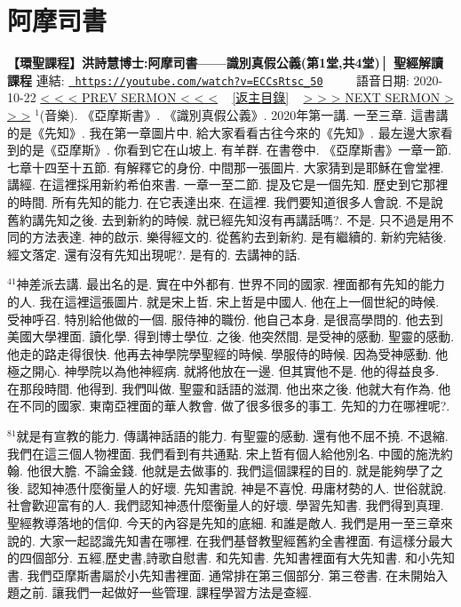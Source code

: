\documentclass{book}
\begin{document}
\section{阿摩司書}
\label{sec:ECCsRtsc_50}
\textbf{【環聖課程】洪詩慧博士:阿摩司書——識別真假公義(第1堂,共4堂)│ 聖經解讀課程}
\newline
\newline
連結: \href{https://youtube.com/watch?v=ECCsRtsc_50}{\texttt{ https://youtube.com/watch?v=ECCsRtsc\_50}} ~~~~ 語音日期: 2020-10-22 
\newline
\newline
\hyperref[sec:I0SwLQsiJOs]{\small{< < < PREV SERMON < < <}}
~
\hyperref[sec:index]{\small{[返主目錄]}}
~
\hyperref[sec:g1wzcqEF6WA]{\small{> > > NEXT SERMON > > >}}
\newline
\newline
$^{1}$(音樂).
《亞摩斯書》.
《識別真假公義》.
2020年第一講.
一至三章.
這書講的是《先知》.
我在第一章圖片中.
給大家看看古往今來的《先知》.
最左邊大家看到的是《亞摩斯》.
你看到它在山坡上.
有羊群.
在書卷中.
《亞摩斯書》一章一節.
七章十四至十五節.
有解釋它的身份.
中間那一張圖片.
大家猜到是耶穌在會堂裡.
講經.
在這裡採用新約希伯來書.
一章一至二節.
提及它是一個先知.
歷史到它那裡的時間.
所有先知的能力.
在它表達出來.
在這裡.
我們要知道很多人會說.
不是說舊約講先知之後.
去到新約的時候.
就已經先知沒有再講話嗎?.
不是.
只不過是用不同的方法表達.
神的啟示.
樂得經文的.
從舊約去到新約.
是有繼續的.
新約完結後.
經文落定.
還有沒有先知出現呢?.
是有的.
去講神的話.

$^{41}$神差派去講.
最出名的是.
實在中外都有.
世界不同的國家.
裡面都有先知的能力的人.
我在這裡這張圖片.
就是宋上哲.
宋上哲是中國人.
他在上一個世紀的時候.
受神呼召.
特別給他做的一個.
服侍神的職份.
他自己本身.
是很高學問的.
他去到美國大學裡面.
讀化學.
得到博士學位.
之後.
他突然間.
是受神的感動.
聖靈的感動.
他走的路走得很快.
他再去神學院學聖經的時候.
學服侍的時候.
因為受神感動.
他極之開心.
神學院以為他神經病.
就將他放在一邊.
但其實他不是.
他的得益良多.
在那段時間.
他得到.
我們叫做.
聖靈和話語的滋潤.
他出來之後.
他就大有作為.
他在不同的國家.
東南亞裡面的華人教會.
做了很多很多的事工.
先知的力在哪裡呢?.

$^{81}$就是有宣教的能力.
傳講神話語的能力.
有聖靈的感動.
還有他不屈不撓.
不退縮.
我們在這三個人物裡面.
我們看到有共通點.
宋上哲有個人給他別名.
中國的施洗約翰.
他很大膽.
不論金錢.
他就是去做事的.
我們這個課程的目的.
就是能夠學了之後.
認知神憑什麼衡量人的好壞.
先知書說.
神是不喜悅.
毋庸材勢的人.
世俗就說.
社會歡迎富有的人.
我們認知神憑什麼衡量人的好壞.
學習先知書.
我們得到真理.
聖經教導落地的信仰.
今天的內容是先知的底細.
和誰是敵人.
我們是用一至三章來說的.
大家一起認識先知書在哪裡.
在我們基督教聖經舊約全書裡面.
有這樣分最大的四個部分.
五經,歷史書,詩歌自慰書.
和先知書.
先知書裡面有大先知書.
和小先知書.
我們亞摩斯書屬於小先知書裡面.
通常排在第三個部分.
第三卷書.
在未開始入題之前.
讓我們一起做好一些管理.
課程學習方法是查經.
\end{document}
